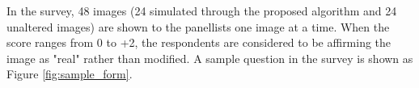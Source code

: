 \begin{spacing}{1.5}
In the survey, 48 images (24 simulated through the proposed algorithm and 24 unaltered images) are shown to the panellists one image at a time. When the score ranges from 0 to +2, the respondents are considered to be affirming the image as "real" rather than modified. A sample question in the survey is shown as Figure \ref{fig:sample_form}.
\end{spacing}
\newpage
